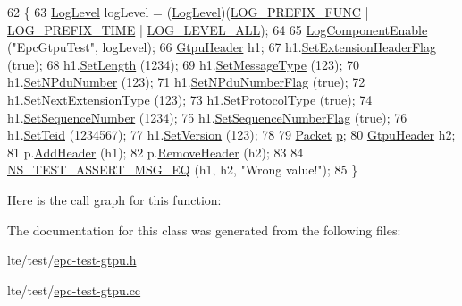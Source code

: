 \begin{DoxyCode}
62 \{
63   \hyperlink{namespacens3_aa6464a4d69551a9cc968e17a65f39bdb}{LogLevel} logLevel = (\hyperlink{namespacens3_aa6464a4d69551a9cc968e17a65f39bdb}{LogLevel})(\hyperlink{namespacens3_aa6464a4d69551a9cc968e17a65f39bdba0dd332264f60317e9a365095e80037d1}{LOG\_PREFIX\_FUNC} | 
      \hyperlink{namespacens3_aa6464a4d69551a9cc968e17a65f39bdba2b78ce26a040614a34c7d71db83024b9}{LOG\_PREFIX\_TIME} | \hyperlink{namespacens3_aa6464a4d69551a9cc968e17a65f39bdba022b1237a4fd1b08d034471df3c58586}{LOG\_LEVEL\_ALL});
64 
65   \hyperlink{namespacens3_adc4ef4f00bb2f5f4edae67fc3bc27f20}{LogComponentEnable} (\textcolor{stringliteral}{"EpcGtpuTest"}, logLevel);
66   \hyperlink{classns3_1_1GtpuHeader}{GtpuHeader} h1;
67   h1.\hyperlink{classns3_1_1GtpuHeader_a346f3e19635a964c2baaf52f3e76ec81}{SetExtensionHeaderFlag} (\textcolor{keyword}{true});
68   h1.\hyperlink{classns3_1_1GtpuHeader_abad61a7670462a12486774e05d39eb0e}{SetLength} (1234);
69   h1.\hyperlink{classns3_1_1GtpuHeader_ae4576011cbcae77d24bd5b94fc0cee2e}{SetMessageType} (123);
70   h1.\hyperlink{classns3_1_1GtpuHeader_afaeca3a37bc2c8a2014223ff66674320}{SetNPduNumber} (123);
71   h1.\hyperlink{classns3_1_1GtpuHeader_af325ff08c6a9690dba518efe0dea1647}{SetNPduNumberFlag} (\textcolor{keyword}{true});
72   h1.\hyperlink{classns3_1_1GtpuHeader_ab2a334fd893925ad78b2684085382bae}{SetNextExtensionType} (123);
73   h1.\hyperlink{classns3_1_1GtpuHeader_af7eb917193713e4c7aec4f661b9a0d68}{SetProtocolType} (\textcolor{keyword}{true});
74   h1.\hyperlink{classns3_1_1GtpuHeader_a2e59425b9f6358c4f63790407427ffcf}{SetSequenceNumber} (1234);
75   h1.\hyperlink{classns3_1_1GtpuHeader_a177155359e98749daa98427c0f6b8882}{SetSequenceNumberFlag} (\textcolor{keyword}{true});
76   h1.\hyperlink{classns3_1_1GtpuHeader_a480c1d002a1a4f4b490c8e8c223f29f5}{SetTeid} (1234567);
77   h1.\hyperlink{classns3_1_1GtpuHeader_aab24b29caeb8f761c5642dd8a04b4891}{SetVersion} (123);
78 
79   \hyperlink{classns3_1_1Packet}{Packet} \hyperlink{lte__link__budget_8m_ac9de518908a968428863f829398a4e62}{p};
80   \hyperlink{classns3_1_1GtpuHeader}{GtpuHeader} h2;
81   p.\hyperlink{classns3_1_1Packet_a465108c595a0bc592095cbcab1832ed8}{AddHeader} (h1);
82   p.\hyperlink{classns3_1_1Packet_a0961eccf975d75f902d40956c93ba63e}{RemoveHeader} (h2);
83 
84   \hyperlink{group__testing_ga2a9d78cffb3db8e867c35fff0b698cf5}{NS\_TEST\_ASSERT\_MSG\_EQ} (h1, h2, \textcolor{stringliteral}{"Wrong value!"});
85 \}
\end{DoxyCode}


Here is the call graph for this function\+:




The documentation for this class was generated from the following files\+:\begin{DoxyCompactItemize}
\item 
lte/test/\hyperlink{epc-test-gtpu_8h}{epc-\/test-\/gtpu.\+h}\item 
lte/test/\hyperlink{epc-test-gtpu_8cc}{epc-\/test-\/gtpu.\+cc}\end{DoxyCompactItemize}
